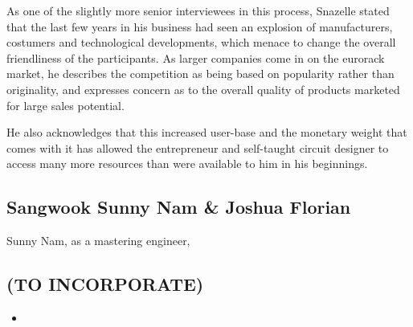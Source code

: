 As one of the slightly more senior interviewees in this process, Snazelle stated that the last few years in his business had seen an explosion of manufacturers, costumers and technological developments, which menace to change the overall friendliness of the participants. As larger companies come in on the eurorack market, he describes the competition as being based on popularity rather than originality, and expresses concern as to the overall quality of products marketed for large sales potential. 

He also acknowledges that this increased user-base and the monetary weight that comes with it has allowed the entrepreneur and self-taught circuit designer to access many more resources than were available to him in his beginnings. 

%
\subsection{Sangwook Sunny Nam & Joshua Florian}

Sunny Nam, as a mastering engineer, 

%
%
%

\begin{unsortedStuff}	
\section*{(TO INCORPORATE)}
	\begin{itemize}
		\item 
	\end{itemize}
\end{unsortedStuff}
		
\begin{optBlankSpace}
	\newpage
	\mbox{}
\end{optBlankSpace}

